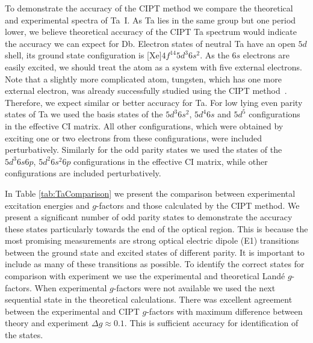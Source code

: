 \documentclass[10pt,a4paper, twoside]{report}
\begin{document}
To demonstrate the accuracy of the CIPT method we compare the theoretical and experimental spectra of Ta~I. As Ta lies in the same group but one period lower, we believe theoretical accuracy of the CIPT Ta spectrum would indicate the accuracy we can expect for Db. Electron states of neutral Ta have an open $5d$ shell, its ground state configuration is [Xe]$4f^{14}5d^3 6s^2$. As the $6s$ electrons are easily excited, we should treat the atom as a system with five external electrons. Note that a slightly more complicated atom, tungsten, which has one more external electron, was already successfully studied using the CIPT method~\cite{DBHF2017}. Therefore, we expect similar or better accuracy for Ta. For low lying even parity states of Ta we used the basis states of the $5d^3 6s^2$, $5d^4 6s$ and $5d^5$  configurations in the effective CI matrix. All other configurations, which were obtained by exciting one or two electrons from these configurations, were included perturbatively. Similarly for the odd parity states we used the states of the $5d^3 6s 6p$, $5d^2 6s^2 6p$ configurations in the effective CI matrix, while other configurations are included perturbatively.

In Table \ref{tab:TaComparison} we present the comparison between experimental excitation energies and $g$-factors and those calculated by the CIPT method.  We present a significant number of odd parity states to demonstrate the accuracy these states particularly towards the end of the optical region. This is because the most promising measurements are strong optical electric dipole (E1) transitions between the ground state and excited states of different parity. 
It is important to include as many of these transitions as possible. To identify the correct states for comparison with experiment 
we use the experimental and theoretical Land\'{e} $g$-factors. When experimental $g$-factors were not available we used the next sequential state in the theoretical calculations. There was excellent agreement between the experimental and CIPT $g$-factors with maximum difference between theory and experiment $\Delta g \approx 0.1$. This is sufficient accuracy for identification of the states.
\end{document}
